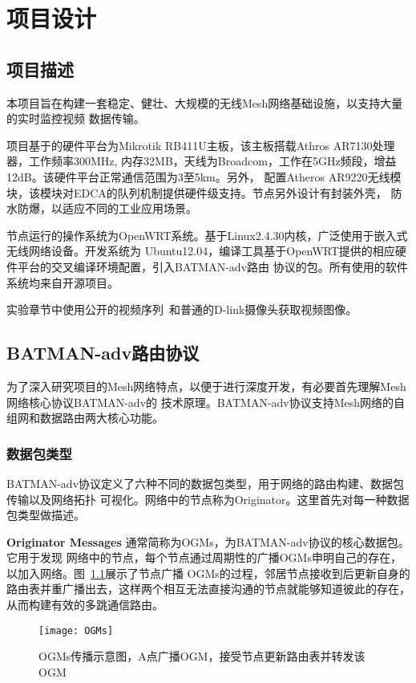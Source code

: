 \chapter{项目设计}
\label{cha:project_design}

\section{项目描述}
本项目旨在构建一套稳定、健壮、大规模的无线Mesh网络基础设施，以支持大量的实时监控视频
数据传输。

项目基于的硬件平台为Mikrotik RB411U主板，该主板搭载Athros AR7130处理器，工作频率300MHz,
内存32MB，天线为Broadcom，工作在5GHz频段，增益12dB。该硬件平台正常通信范围为3至5km。另外，
配置Atheros AR9220无线模块，该模块对EDCA的队列机制提供硬件级支持。节点另外设计有封装外壳，
防水防爆，以适应不同的工业应用场景。

节点运行的操作系统为OpenWRT系统。基于Linux2.4.30内核，广泛使用于嵌入式无线网络设备。开发系统为
Ubuntu12.04，编译工具基于OpenWRT提供的相应硬件平台的交叉编译环境配置，引入BATMAN-adv路由
协议的包。所有使用的软件系统均来自开源项目。

实验章节中使用公开的视频序列~\cite{videos}和普通的D-link摄像头获取视频图像。

\section{BATMAN-adv路由协议}
\label{sec:3.2}
为了深入研究项目的Mesh网络特点，以便于进行深度开发，有必要首先理解Mesh网络核心协议BATMAN-adv的
技术原理。BATMAN-adv协议支持Mesh网络的自组网和数据路由两大核心功能。

\subsection{数据包类型}
BATMAN-adv协议定义了六种不同的数据包类型，用于网络的路由构建、数据包传输以及网络拓扑
可视化。网络中的节点称为Originator。这里首先对每一种数据包类型做描述。

\textbf{Originator Messages} 通常简称为OGMs，为BATMAN-adv协议的核心数据包。它用于发现
网络中的节点，每个节点通过周期性的广播OGMs申明自己的存在，以加入网络。图~\ref{fig:ogms}展示了节点广播
OGMs的过程，邻居节点接收到后更新自身的路由表并重广播出去，这样两个相互无法直接沟通的节点就能够知道彼此的存在，
从而构建有效的多跳通信路由。
\begin{figure}[H] %
  \centering
  \texttt{[image: OGMs]}
  \caption{OGMs传播示意图，A点广播OGM，接受节点更新路由表并转发该OGM}
  \label{fig:ogms}
\end{figure}

